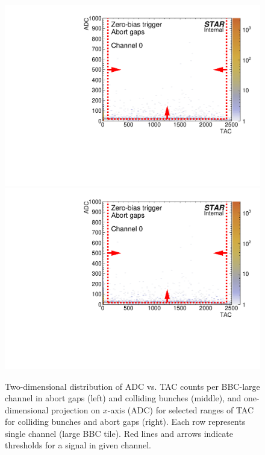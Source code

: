 \begin{figure}[hb]
\caption[Distribution of ADC vs. TAC counts (2D) and ADC conunts (1D) per BBC-large channel in abort gaps and colliding bunches.]{Two-dimensional distribution of ADC vs. TAC counts per BBC-large channel in abort gaps (left) and colliding bunches (middle), and one-dimensional projection on $x$-axis (ADC) for selected ranges of TAC for colliding bunches and abort gaps (right). Each row represents single channel (large BBC tile). Red lines and arrows indicate thresholds for a signal in given channel.}\label{fig:bbcLargeAdcVsTac}
\centering
\parbox{0.327\textwidth}{
  \centering
  \includegraphics[width=\linewidth,page=17]{graphics/eventSelection/bbc/Bbc_ADCvsTAC_abortGaps.pdf}\\
  \includegraphics[width=\linewidth,page=18]{graphics/eventSelection/bbc/Bbc_ADCvsTAC_abortGaps.pdf}\\
}
\end{figure}
